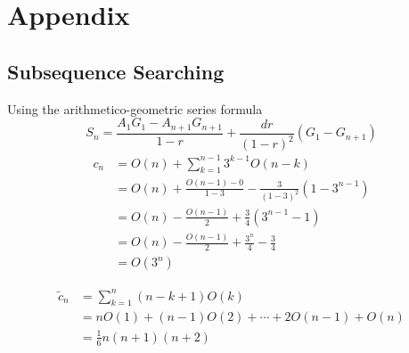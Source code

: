 \chapter*{Appendix} \label{chap:appendix}

\section{Subsequence Searching}


Using the arithmetico-geometric series formula
\[
	S_n = \frac{A_1G_1-A_{n+1}G_{n+1}}{1-r} +\frac{dr}{(1-r)^2}(G_1-G_{n+1})
\]
\label{app:cn}
\begin{align*}
	c_n &= O(n) + \sum_{k=1}^{n-1}3^{k-1}O(n-k)\\
	&= O(n) + \frac{O(n-1) - 0}{1-3} - \frac{3}{(1-3)^2}(1-3^{n-1})\\
	&= O(n) - \frac{O(n-1)}{2} +\frac{3}{4}(3^{n-1}-1)\\
	&= O(n) - \frac{O(n-1)}{2} + \frac{3^n}{4} - \frac{3}{4}\\
	&= O(3^n)
\end{align*}

\label{app:cn-dyn}
\begin{align*}
	\tilde c_n &= \sum_{k=1}^n(n-k+1)O(k)\\
	&= n O(1) + (n-1) O(2) +\cdots + 2 O(n-1) + O(n)\\
	&= \frac{1}{6}n(n+1)(n+2)
\end{align*}
